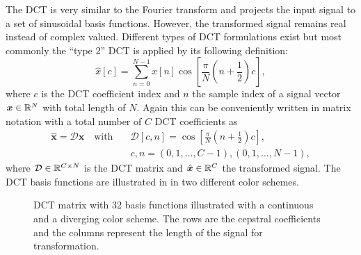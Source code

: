 The DCT is very similar to the Fourier transform and projects the input signal to a set of sinusoidal basis functions. 
However, the transformed signal remains real instead of complex valued.
Different types of DCT formulations exist but most commonly the \enquote{type 2} DCT is applied by its following definition:
\begin{equation}\label{eq:signal_mfcc_dct}
  \hat{x}[c] = \sum_{n=0}^{N-1} x[n] \cos{\left[ \frac{\pi}{N} \left( n + \frac{1}{2} \right) c \right]},
\end{equation}
where $c$ is the DCT coefficient index and $n$ the sample index of a signal vector $\bm{x} \in \mathbb{R}^N$ with total length of $N$.
Again this can be conveniently written in matrix notation with a total number of $C$ DCT coefficients as
\begin{equation}\label{eq:signal_mfcc_dct_matrix}
  \begin{aligned}
    \hat{\bm{x}} = \mathcal{D} \bm{x} \quad \mathrm{with} 
    \quad &\mathcal{D}[c, n] = \cos{\left[ \frac{\pi}{N} \left( n + \frac{1}{2} \right) c  \right]},\\
    &c, n = (0, 1, \dots, C - 1), (0, 1, \dots, N - 1),
  \end{aligned}
\end{equation}
where $\mathcal{D} \in \mathbb{R}^{C \times N}$ is the DCT matrix and $\hat{\bm{x}} \in \mathbb{R}^C$ the transformed signal.
The DCT basis functions are illustrated in  in two different color schemes.
\begin{figure}[!ht]
  \centering
  \qquad
  \caption{DCT matrix with 32 basis functions illustrated with a continuous and a diverging color scheme. The rows are the cepstral coefficients and the columns represent the length of the signal for transformation.}
  \label{fig:signal_mfcc_dct}
\end{figure}
